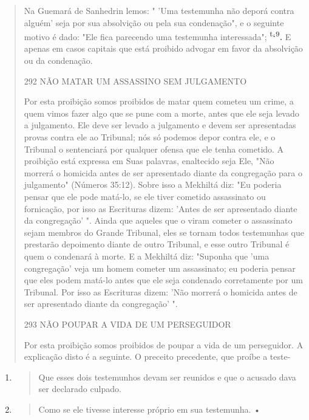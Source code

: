 \begin{quote}
Na Guemará de Sanhedrin lemos: " 'Uma testemunha não deporá con­tra
alguém' seja por sua absolvição ou pela sua condenação", e o seguinte
moti­vo é dado: "Ele fica parecendo uma testemunha interessada";
\textbf{\textsuperscript{t}`\textsuperscript{9}.} E apenas em casos
capitais que está proibido advogar em favor da absolvição ou da
condenação.

292 NÃO MATAR UM ASSASSINO SEM JULGAMENTO

Por esta proibição somos proibidos de matar quem cometeu um cri­me, a
quem vimos fazer algo que se pune com a morte, antes que ele seja levado
a julgamento. Ele deve ser levado a julgamento e devem ser apresentadas
provas contra ele ao Tribunal; nós só podemos depor contra ele, e o
Tribunal o senten­ciará por qualquer ofensa que ele tenha cometido. A
proibição está expressa em Suas palavras, enaltecido seja Ele, "Não
morrerá o homicida antes de ser apresen­tado diante da congregação para
o julgamento" (Números 35:12). Sobre isso a Mek­hiltá diz: "Eu poderia
pensar que ele pode matá-lo, se ele tiver cometido assassi­nato ou
fornicação, por isso as Escrituras dizem: 'Antes de ser apresentado
diante da congregação' ". Ainda que aqueles que o viram cometer o
assassinato sejam membros do Grande Tribunal, eles se tornam todos
testemunhas que prestarão depoimento diante de outro Tribunal, e esse
outro Tribunal é quem o condenará à morte. E a Mekhiltá diz: "Suponha
que 'uma congregação' veja um homem co­meter um assassinato; eu poderia
pensar que eles podem matá-lo antes que ele seja condenado corretamente
por um Tribunal. Por isso as Escrituras dizem: 'Não morrerá o homicida
antes de ser apresentado diante da congregação' ".

293 NÃO POUPAR A VIDA DE UM PERSEGUIDOR

Por esta proibição somos proibidos de poupar a vida de um perse­guidor.
A explicação disto é a seguinte. O preceito precedente, que proíbe a
teste-
\end{quote}

\begin{enumerate}
\def\labelenumi{\arabic{enumi}.}
\setcounter{enumi}{417}
\item
  \begin{quote}
  Que esses dois testemunhos devam ser reunidos e que o acusado dava ser
  declarado culpado.
  \end{quote}
\item
  \begin{quote}
  Como se ele tivesse interesse próprio em sua testemunha. •
  \end{quote}
\end{enumerate}

